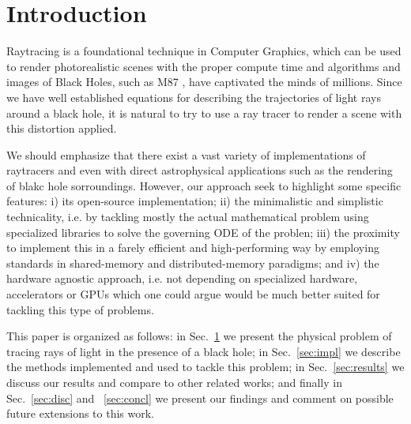 


\section{Introduction}
\label{sec:intro}



Raytracing is a foundational technique in Computer Graphics, which can be used to render photorealistic scenes with the proper compute time and algorithms and images of Black Holes, such as M87 \cite{M87_EHT_i}, have captivated the minds of millions. Since we have well established equations for describing the trajectories of light rays around a black hole, it is natural to try to use a ray tracer to render a scene with this distortion applied.

We should emphasize that there exist a vast variety of implementations
of raytracers
\cite{sharma2023mahakalapythonbasedmodularraytracing,James_2015,imbens2023graphicalprocessinggeodesicpropagation}
and even with direct astrophysical applications such as
the rendering of blakc hole sorroundings.
However, our approach seek to highlight some specific features:
i) its open-source implementation;
ii) the minimalistic and simplistic technicality, i.e. by tackling
mostly the actual mathematical problem using specialized libraries
to solve the governing ODE of the problen;
iii) the proximity to implement this in a farely efficient and high-performing
way by employing standards in shared-memory and distributed-memory paradigms;
and iv) the hardware agnostic approach, i.e. not depending on specialized hardware, accelerators or GPUs which one could argue would be much better suited for tackling this type of problems.


This paper is organized as follows:
in Sec.~\ref{sec:intro} we present the physical problem of tracing rays of light in the presence of a black hole;
in Sec.~\ref{sec:impl} we describe the methods implemented and used to tackle this problem;
in Sec.~\ref{sec:results} we discuss our results and compare to other related works;
and finally in Sec.~\ref{sec:disc} and ~\ref{sec:concl} we present our findings and comment
on possible future extensions to this work.


